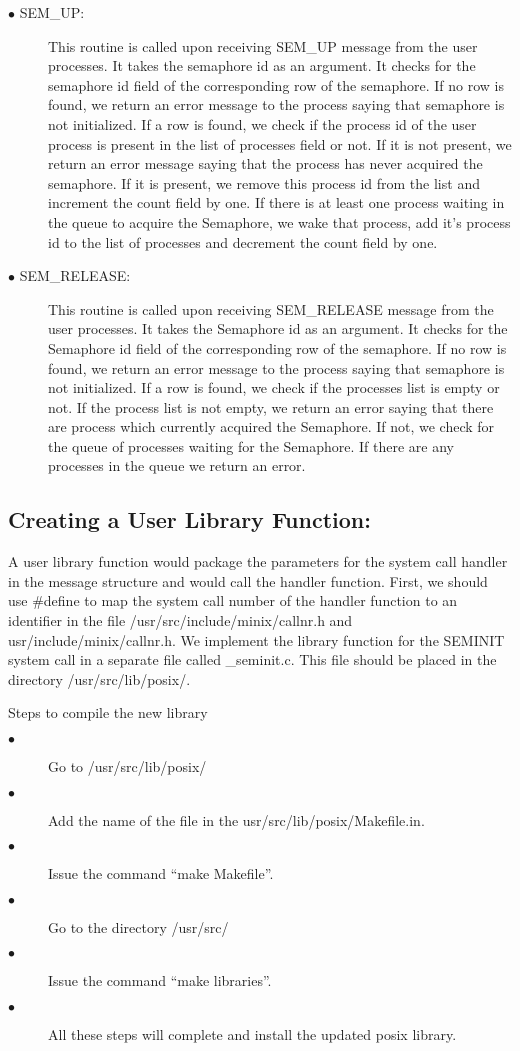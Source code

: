 \documentclass[a4paper,11pt,twocolumn]{article}
\begin{document}
\begin{description}
\item[$\bullet$ SEM\_UP:] This routine is called upon receiving SEM\_UP message from the user processes. It takes the semaphore id as an argument. It checks for the semaphore id field of the corresponding row of the semaphore. If no row is found, we return an error message to the process saying that semaphore is not initialized. If a row is found, we check if the process id of the user process is present in the list of processes field or not. If it is not present, we return an error message saying that the process has never acquired the semaphore. If it is present, we remove this process id from the list and increment the count field by one. If there is at least one process waiting in the queue to acquire the Semaphore, we wake that process, add it’s process id to the list of processes and decrement the count field by one. 
\item[$\bullet$ SEM\_RELEASE:] This routine is called upon receiving SEM\_RELEASE message from the user processes. It takes the Semaphore id as an argument. It checks for the Semaphore id field of the corresponding row of the semaphore. If no row is found, we return an error message to the process saying that semaphore is not initialized. If a row is found, we check if the processes list is empty or not. If the process list is not empty, we return an error saying that there are process which currently acquired the Semaphore. If not, we check for the queue of processes waiting for the Semaphore. If there are any processes in the queue we return an error.

\end{description}

\subsection{ Creating a User Library Function: }
A user library function would package the parameters for the system call handler in the message structure and would call the handler function. First, we should use \#define to map the system call number of the handler function to an identifier in the file /usr/src/include/minix/callnr.h and usr/include/minix/callnr.h. We implement the library function for the SEMINIT system call in a separate file called \_seminit.c. This file should be placed in the directory /usr/src/lib/posix/.

Steps to compile the new library

\begin{description}
  \item[$\bullet$ ] Go to /usr/src/lib/posix/
  \item[$\bullet$ ] Add the name of the file in the usr/src/lib/posix/Makefile.in.
  \item[$\bullet$ ] Issue the command “make Makefile”.
  \item[$\bullet$ ] Go to the directory /usr/src/
  \item[$\bullet$ ] Issue the command “make libraries”.
  \item[$\bullet$ ] All these steps will complete and install the updated posix library.
\end{description}
\end{document}
